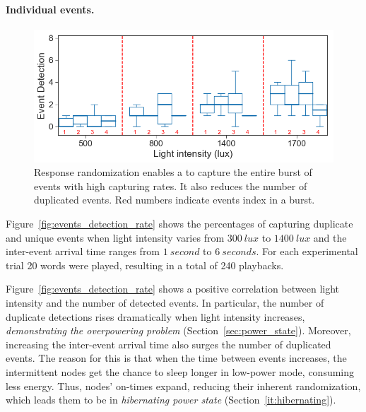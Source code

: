 \paragraph{Individual events.}
\begin{figure}[t]
	\centering
     \includegraphics[width=\columnwidth]{figures/events_burst_rand_2}
    \caption{Response randomization enables a \cis to capture the entire burst of events with high capturing rates. It also reduces the number of duplicated events. Red numbers indicate events index in a burst.}
    \label{fig:events_burst_rand}
\end{figure}

Figure~\ref{fig:events_detection_rate} shows the percentages of capturing duplicate and unique events when light intensity varies from $\SI{300}{lux}$ to $\SI{1400}{lux}$ and the inter-event arrival time ranges from $\SI{1}{second}$ to $\SI{6}{seconds}$. For each experimental trial 20 words were played, resulting in a total of 240 playbacks. 

Figure~\ref{fig:events_detection_rate} shows a positive correlation between light intensity and the number of detected events. In particular, the number of duplicate detections rises dramatically when light intensity increases, \emph{demonstrating the overpowering problem} (Section~\ref{sec:power_state}). Moreover, increasing the inter-event arrival time also surges the number of duplicated events. The reason for this is that when the time between events increases, the intermittent nodes get the chance to sleep longer in low-power mode, consuming less energy. Thus, nodes' on-times expand, reducing their inherent randomization, which leads them to be in \textit{hibernating power state} (Section~\ref{it:hibernating}).  


